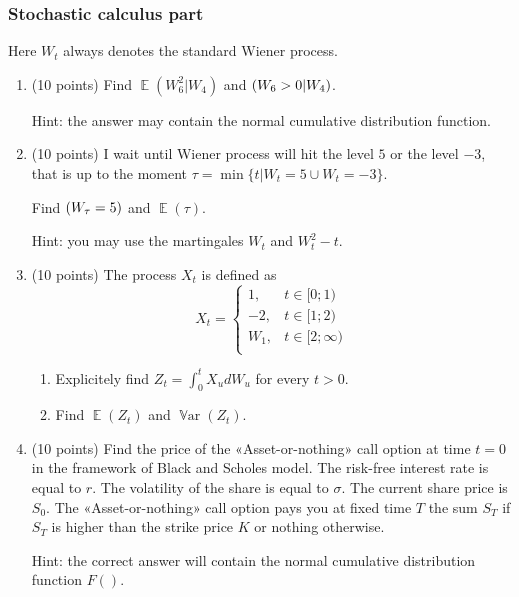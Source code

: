 \documentclass[12pt, a4paper]{article}
\DeclareMathOperator{\E}{\mathbb{E}}
\let\P\relax
\DeclareMathOperator{\P}{\mathbb{P}}
\DeclareMathOperator{\Var}{\mathbb{V}ar}
\begin{document}
\subsubsection*{Stochastic calculus part}

Here $W_t$ always denotes the standard Wiener process.

\vspace{10pt}

\begin{enumerate}


\item (10 points) Find $\E(W_6^2|W_4)$ and $\P(W_6>0|W_4)$.

Hint: the answer may contain the normal cumulative distribution function.

\item (10 points) I wait until Wiener process will hit the level $5$ or the level $-3$, 
that is up to the moment $\tau=\min\{t|W_{t}=5 \cup W_{t}=-3\}$.

Find $\P(W_{\tau} = 5)$ and $\E(\tau)$.

Hint: you may use the martingales $W_{t}$ and $W_{t}^2-t$.


\item (10 points) The process $X_t$ is defined as
\[
X_{t}=\begin{cases}
1, & t\in[0;1) \\
-2, & t\in[1;2) \\
W_1,& t\in[2;\infty) \\
\end{cases}
\]

\begin{enumerate}
\item Explicitely find $Z_t = \int_{0}^{t}X_{u}dW_{u}$ for every $t>0$.
\item Find $\E(Z_t)$ and $\Var(Z_t)$.
\end{enumerate}


\item (10 points) Find the price of the «Asset-or-nothing» call option at time $t=0$ in the framework of Black and Scholes model. 
The risk-free interest rate is equal to $r$. The volatility of the share is equal to $\sigma$. 
The current share price is $S_0$. 
The «Asset-or-nothing» call option pays you at fixed time $T$ the sum $S_T$ 
if $S_T$ is higher than the strike price $K$ or nothing otherwise.

Hint: the correct answer will contain the normal cumulative distribution function $F()$.

\end{enumerate}
\end{document}
